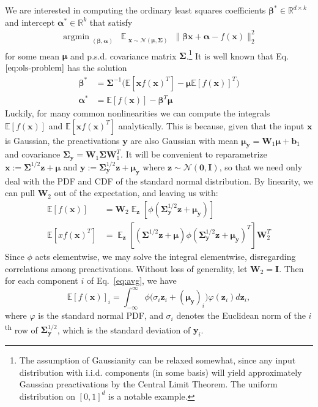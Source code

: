 \documentclass{article}
\theoremstyle{plain}
\theoremstyle{definition}
\theoremstyle{remark}
\newcommand{\aalpha}{\boldsymbol{\alpha}}
\newcommand{\bbeta}{\boldsymbol{\beta}}
\newcommand{\mmu}{\boldsymbol{\mu}}
\newcommand{\SSigma}{\boldsymbol{\Sigma}}
\newcommand{\E}{\mathbb{E}}
\newcommand{\R}{\mathbb{R}}
\newcommand{\II}{\boldsymbol{I}}
\newcommand{\xx}{\boldsymbol{x}}
\newcommand{\yy}{\boldsymbol{y}}
\newcommand{\zz}{\boldsymbol{z}}
\begin{document}
We are interested in computing the ordinary least squares coefficients $\bbeta^* \in \R^{d \times k}$ and intercept $\aalpha^* \in \R^k$ that satisfy
\begin{align}\label{eq:ols-problem}
\mathop{\mathrm{argmin}}_{\substack{(\bbeta, \aalpha)}} \mathop{\E}_{\substack{\xx \sim \mathcal{N}(\mmu, \SSigma)}} \| \bbeta \xx + \aalpha - f(\xx) \|^2_2
\end{align}
for some mean $\mmu$ and p.s.d. covariance matrix $\SSigma$.\footnote{The assumption of Gaussianity can be relaxed somewhat, since any input distribution with i.i.d. components (in some basis) will yield approximately Gaussian preactivations by the Central Limit Theorem. The uniform distribution on $[0, 1]^d$ is a notable example.} It is well known that Eq.~$\ref{eq:ols-problem}$ has the solution
\begin{align}
    \bbeta^* &= \SSigma^{-1} \big ( \E [\xx f(\xx)^T] - \mmu \E [f(\xx)]^T \big ) \\
    \aalpha^* &= \E[ f(\xx) ] - \bbeta^T \mmu
\end{align}
Luckily, for many common nonlinearities we can compute the integrals $\E[f(\xx)]$ and $\E [\xx f(\xx)^T]$ analytically. This is because, given that the input $\xx$ is Gaussian, the preactivations $\yy$ are also Gaussian with mean $\mmu_{\yy} = \mathbf{W}_1\mmu + \mathbf{b}_1$ and covariance $\SSigma_{\yy} = \mathbf{W}_1\SSigma\mathbf{W}_1^T$. It will be convenient to reparametrize $\xx := \SSigma^{1/2}\zz + \mmu$ and $\yy := \SSigma_{\yy}^{1/2}\zz + \mmu_{\yy}$ where $\zz \sim \mathcal{N}(\boldsymbol{0}, \II)$, so that we need only deal with the PDF and CDF of the standard normal distribution. By linearity, we can pull $\mathbf{W}_2$ out of the expectation, and leaving us with:
\begin{align}
    \E[f(\xx)] &= \mathbf{W}_2 \mathop{\E}_{\zz} [\phi(\SSigma_{\yy}^{1/2}\zz + \mmu_{\yy})]\label{eq:avg} \\
    \E[x f(\xx)^T] &= \mathop{\E}_{\zz} [(\SSigma^{1/2} \zz + \mmu) \phi(\SSigma_{\yy}^{1/2}\zz + \mmu_{\yy})^T] \mathbf{W}_2^T\label{eq:cross-cov}
\end{align}
Since $\phi$ acts elementwise, we may solve the integral elementwise, disregarding correlations among 
preactivations. Without loss of generality, let $\mathbf{W}_2 = \II$. Then for each component $i$ of Eq.~\ref{eq:avg}, we have
\begin{equation}
    \E[f(\xx)]_i = \int_{-\infty}^\infty \phi \big (\sigma_i \zz_i + (\mmu_{\yy})_i \big ) \varphi(\zz_i) d\zz_i,
\end{equation}
where $\varphi$ is the standard normal PDF, and $\sigma_i$ denotes the Euclidean norm of the $i$\textsuperscript{th} row of $\SSigma_{\yy}^{1/2}$, which is the standard deviation of $\yy_i$. %
\end{document}
